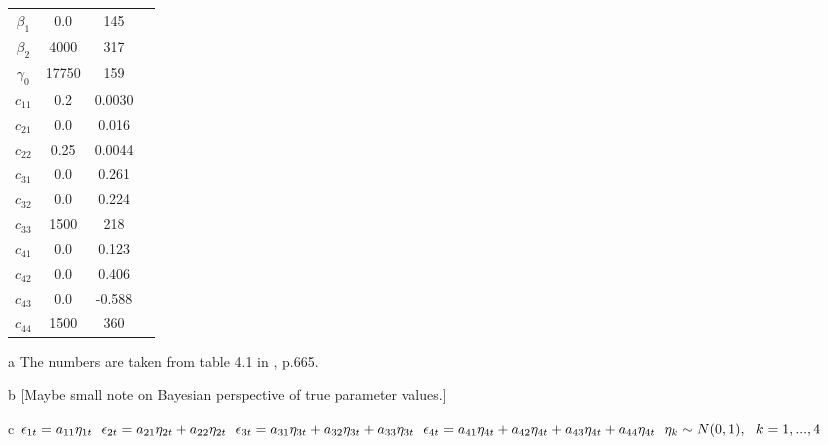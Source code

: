 \documentclass[a4paper,12pt]{article}
\begin{document}
\begin{table}[H]
\begin{threeparttable}
\begin{tabular}{cS[table-format=3.2]S[table-format=3.2]c}
		$\beta_1$     & 0.0    & 145                &       \\
		 $\beta_2$     & 4000   & 317                &       \\
		$\gamma_0$    & 17750  & 159                &       \\
		 $c_{11}$      & 0.2    & 0.0030             &       \\
		$c_{21}$      & 0.0    & 0.016              &       \\
		 $c_{22}$      & 0.25   & 0.0044             &       \\
		$c_{31}$      & 0.0    & 0.261              &       \\
		 $c_{32}$      & 0.0    & 0.224              &       \\
		$c_{33}$      & 1500   & 218                &       \\
		 $c_{41}$      & 0.0    & 0.123              &       \\
		$c_{42}$      & 0.0    & 0.406              &       \\
		 $c_{43}$      & 0.0    & -0.588             &       \\
		$c_{44}$      & 1500   & 360                &       \\ \bottomrule
	\end{tabular}
  \begin{tablenotes}
	\item[a] The numbers are taken from table 4.1 in \cite{Keane.1994}, p.665.
	\item[b] [Maybe small note on Bayesian perspective of true parameter values.]
	\item[c] $\epsilon_{1t} = a_{11} \eta_{1t} \\
    \hspace*{0.66em} \epsilon_{2t} = a_{21} \eta_{2t} + a_{22} \eta_{2t}  \\
	\hspace*{0.66em}\epsilon_{3t} = a_{31} \eta_{3t} + a_{32} \eta_{3t} + a_{33} \eta_{3t}\\
	\hspace*{0.66em}\epsilon_{4t} = a_{41} \eta_{4t} + a_{42} \eta_{4t} + a_{43}   \eta_{4t} + a_{44} \eta_{4t} \\
	\hspace*{0.66em}\eta_k \sim N(0,1), \hspace*{0.66em} k=1,...,4$
  \end{tablenotes}
\end{threeparttable}
\end{table}
\end{document}
